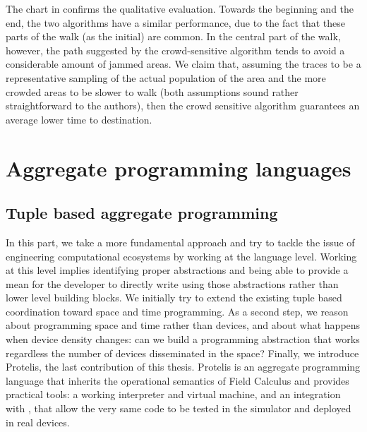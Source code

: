 \documentclass[12pt,a4paper,twoside,openright]{book}
\begin{document}
The chart in  confirms the qualitative evaluation.
%
Towards the beginning and the end, the two algorithms have a similar performance, due to the fact that these parts of the walk (as the initial) are common.
%
In the central part of the walk, however, the path suggested by the crowd-sensitive algorithm tends to avoid a considerable amount of jammed areas.
%
We claim that, assuming the traces to be a representative sampling of the actual population of the area and the more crowded areas to be slower to walk (both assumptions sound rather straightforward to the authors), then the crowd sensitive algorithm guarantees an average lower time to destination.

\part{Aggregate programming languages}
\label{aggregate-programming-part}
\chapter{Tuple based aggregate programming}

In this part, we take a more fundamental approach and try to tackle the issue of engineering computational ecosystems by working at the language level.
%
Working at this level implies identifying proper abstractions and being able to provide a mean for the developer to directly write using those abstractions rather than lower level building blocks.
%
We initially try to extend the existing tuple based coordination toward space and time programming.
%
As a second step, we reason about programming space and time rather than devices, and about what happens when device density changes: can we build a programming abstraction that works regardless the number of devices disseminated in the space?
%
Finally, we introduce Protelis, the last contribution of this thesis.
%
Protelis is an aggregate programming language that inherits the operational semantics of Field Calculus and provides practical tools: a working interpreter and virtual machine, and an integration with \alchemist{}, that allow the very same code to be tested in the simulator and deployed in real devices.
\end{document}

